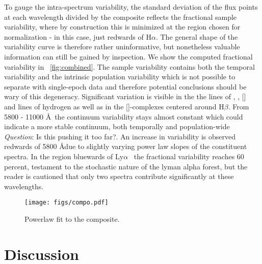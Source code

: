 \documentclass{aa}    %
\newcommand{\figref}[1]{\ref{fig:#1}}
\newcommand{\Fig}[1]{\figurename~\figref{#1}}
\newcommand{\fig}[1]{\Fig{#1}}
\newcommand{\figlabel}[1]{\label{fig:#1}}
\newcommand{\sectlabel}[1]{\label{sect:#1}}
\newcommand{\lya}{Ly$\alpha$}
\newcommand{\hb}{H$\beta$}
\newcommand{\ha}{H$\alpha$}
\newcommand{\oiii}{[\ion{O}{iii}]}
\newcommand{\feii}{[\ion{Fe}{ii}]}
\newcommand{\civ}{\ion{C}{iv}}
\newcommand{\mgii}{\ion{Mg}{ii}}
\newcommand{\todo}[3]{{\color{#2}\emph{#1}: #3}}
\newcommand{\qtodo}[1]{\todo{\\ Question}{red}{#1}}
\begin{document}
 To gauge the intra-spectrum variability, the standard deviation of the flux points at each wavelength divided by the composite reflects the fractional sample variability, where by construction this is minimized at the region chosen for normalization - in this case, just redwards of \ha. The general shape of the variability curve is therefore rather uninformative, but nonetheless valuable information can still be gained by inspection. We show the computed fractional variability in \fig{combined}. The sample variability contains both the temporal variability and the intrinsic population variability which is not possible to separate with single-epoch data and therefore potential conclusions should be wary of this degeneracy.
 Significant variation is visible in the the lines of \civ, \mgii, \oiii~ and lines of hydrogen as well as in the \feii-complexes centered around \hb. From 5800 - 11000 \AA~the continuum variability stays almost constant which could indicate a more stable continuum, both temporally and population-wide \qtodo{Is this pushing it too far?}. An increase in variability is observed redwards of 5800 \AA due to slightly varying power law slopes of the constituent spectra. In the region bluewards of \lya~ the fractional variability reaches 60 percent, testament to the stochastic nature of the lyman alpha forest, but the reader is cautioned that only two spectra contribute significantly at these wavelengths.  
 
 

 
  \begin{figure*}[hbtp]
    \centering
    \texttt{[image: figs/compo.pdf]}
    \caption[]{Powerlaw fit to the composite.}
    \figlabel{composite}
  \end{figure*}




\section{Discussion}  \sectlabel{discuss}
\end{document}
